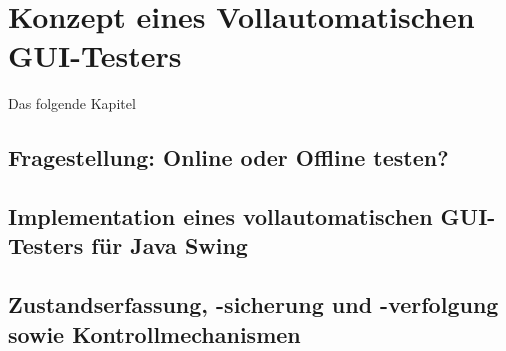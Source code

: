 \chapter{Konzept eines Vollautomatischen GUI-Testers}\label{chapter:conceptfullautoguitesting}


Das folgende Kapitel


\section{Fragestellung: Online oder Offline testen?}\label{section:offoronlinetesting}


\section{Implementation eines vollautomatischen GUI-Testers für Java Swing}\label{section:myfullautoguitest}


\section{Zustandserfassung, -sicherung und -verfolgung sowie Kontrollmechanismen}\label{section:statemonitoring}
